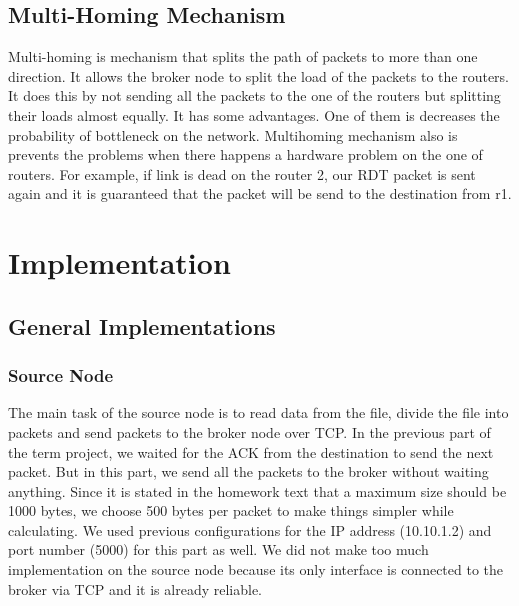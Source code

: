 \documentclass[conference]{IEEEtran}
\begin{document}
\subsection{Multi-Homing Mechanism}
Multi-homing is mechanism that splits the path of packets to more than one direction. It allows the broker node to split the load of the packets to the routers. It does this by not sending all the packets to the one of the routers but splitting their loads almost equally. It has some advantages. One of them is decreases the probability of bottleneck on the network. Multihoming mechanism also is prevents the problems when there happens a hardware problem on the one of routers. For example, if link is dead on the router 2, our RDT packet is sent again and it is guaranteed that the packet will be send to the destination from r1.
\section{Implementation}
\subsection{General Implementations}
\subsubsection{Source Node}
The main task of the source node is to read data from the file, divide the file into packets and send packets to the broker node over TCP. In the previous part of the term project, we waited for the ACK from the destination to send the next packet. But in this part, we send all the packets to the broker without waiting anything. Since it is stated in the homework text that a maximum size should be 1000 bytes, we choose 500 bytes per packet to make things simpler while calculating. We used previous configurations for the IP address (10.10.1.2) and port number (5000) for this part as well. We did not make too much implementation on the source node because its only interface is connected to the broker via TCP and it is already reliable.
\end{document}
